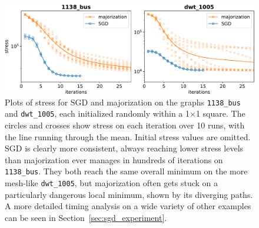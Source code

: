 \begin{figure}
  \centering
  \includegraphics[width=.9\textwidth]{stress/iterations.pdf}
  \caption[Results against majorization for \texttt{1138\_bus} and \texttt{dwt\_1005}]{Plots of stress for SGD and majorization on the graphs \texttt{1138\_bus} and \texttt{dwt\_1005}, each initialized randomly within a 1$\times$1 square.
  The circles and crosses show stress on each iteration over 10 runs, with the line running through the mean.
  Initial stress values are omitted.
  SGD is clearly more consistent, always reaching lower stress levels than majorization ever manages in hundreds of iterations on \texttt{1138\_bus}.
  They both reach the same overall minimum on the more mesh-like \texttt{dwt\_1005}, but majorization often gets stuck on a particularly dangerous local minimum, shown by its diverging paths.
  A more detailed timing analysis on a wide variety of other examples can be seen in Section~\ref{sec:sgd_experiment}.
  }
  \label{fig:stress_plots}
\end{figure}

